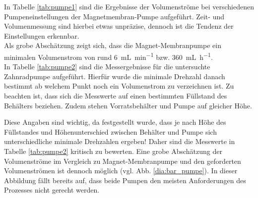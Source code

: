 In Tabelle \ref{tab:pumpe1} sind die Ergebnisse der Volumenströme bei verschiedenen Pumpeneinstellungen der Magnetmembran-Pumpe aufgeführt. Zeit- und Volumenmessung sind hierbei etwas unpräzise, dennoch ist die Tendenz der Einstellungen erkennbar.\\
Als grobe Abschätzung zeigt sich, dass die Magnet-Membranpumpe ein minimalen Volumenstrom von rund \SI{6}{\milli \liter \per \minute} bzw. \SI{360}{\milli \liter \per \hour}.\\
In Tabelle \ref{tab:pumpe2} sind die Messergebnisse für die untersuchte Zahnradpumpe aufgeführt. Hierfür wurde die minimale Drehzahl danach bestimmt ab welchem Punkt noch ein Volumenstrom zu verzeichnen ist. Zu beachten ist, dass sich die Messwerte auf einen bestimmten Füllstand des Behälters beziehen. Zudem stehen Vorratsbehälter und Pumpe auf gleicher Höhe. 
\begin{table}[h!]
	\renewcommand*{\arraystretch}{1.2}
	\centering
	\caption{Volumenströme der Magnet-Membranpumpe in verschiedenen Einstellungen}
	\label{tab:pumpe1}
\end{table}%
\FloatBarrier
\vspace*{-5mm}
Diese Angaben sind wichtig, da festgestellt wurde, dass je nach Höhe des Füllstandes und Höhenunterschied zwischen Behälter und Pumpe sich unterschiedliche minimale Drehzahlen ergeben! Daher sind die Messwerte in Tabelle \ref{tab:pumpe2} kritisch zu bewerten. Eine grobe Abschätzung der Volumenströme im Vergleich zu Magnet-Membranpumpe und den geforderten Volumenströmen ist dennoch möglich (vgl. Abb. \ref{dia:bar_pumpe}). In dieser Abbildung fällt bereits auf, dass beide Pumpen den meisten Anforderungen des Prozesses nicht gerecht werden.
